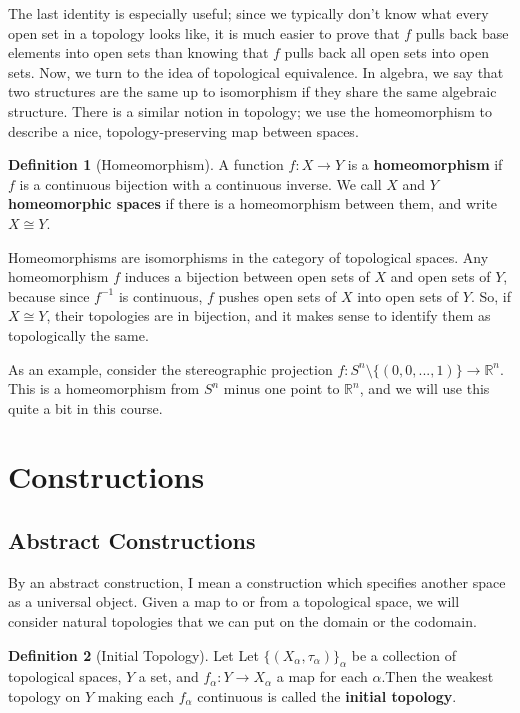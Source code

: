 \documentclass[11pt, oneside]{amsart}   	%
\theoremstyle{definition}
\newtheorem{definition}{Definition}[section]
\begin{document}
	The last identity is especially useful; since we typically don't know what every open set in a topology looks like, it is much easier to prove that $f$ pulls back 
	base elements into open sets than knowing that $f$ pulls back all open sets into open sets. Now, we turn to the idea of topological equivalence. In 
	algebra, we say that two structures are the same up to isomorphism if they share the same algebraic structure. There is a similar notion in topology; 
	we use the homeomorphism to describe a nice, topology-preserving map between spaces.
	
	\begin{definition}[Homeomorphism]
		A function $f : X\rightarrow Y$ is a \textbf{homeomorphism} if $f$ is a continuous bijection with a continuous inverse. We call $X$ and $Y$ \textbf{
		homeomorphic spaces} if there is a homeomorphism between them, and write $X\cong Y$.
	\end{definition}
	
	Homeomorphisms are isomorphisms in the category of topological spaces. Any homeomorphism $f$ induces a bijection between open sets of $X$ and open 
	sets of $Y$, because since $f^{-1}$ is continuous, $f$ pushes open sets of $X$ into open sets of $Y$. So, if $X\cong Y$, their topologies are in bijection, and it 
	makes sense to identify them as topologically the same.
	
	As an example, consider the stereographic projection $f : S^n\setminus\{(0, 0, ..., 1)\}\rightarrow \mathbb R^n$. This is a homeomorphism from $S^n$ 
	minus one point to $\mathbb R^n$, and we will use this quite a bit in this course.
	
	
\section{Constructions}

	\subsection{Abstract Constructions}
	
	By an abstract construction, I mean a construction which specifies another space as a universal object. Given a map to or from a topological space, we will 
	consider natural topologies that we can put on the domain or the codomain. 
	
	\begin{definition}[Initial Topology]
		Let Let $\{(X_\alpha, \tau_\alpha)\}_\alpha$ be a collection of topological spaces, $Y$ a set, and $f_\alpha : 
		Y\rightarrow X_\alpha$ a map for each $\alpha$.Then the weakest topology on $Y$ making each $f_\alpha$ 
		continuous is called the \textbf{initial topology}.
	\end{definition}
	
\end{document}
